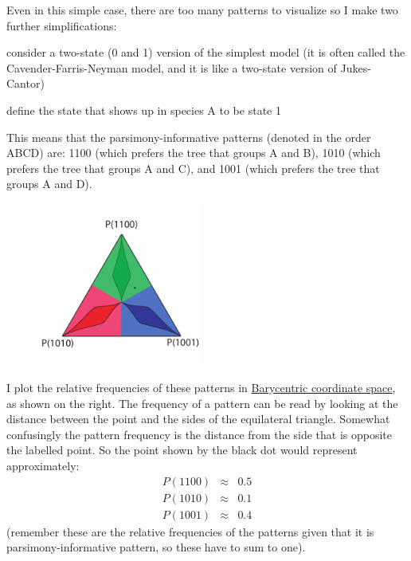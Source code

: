\documentclass[11pt]{article}
\begin{document}
Even in this simple case, there are too many patterns to visualize so I make two further simplifications:
\begin{compactitem}
	\item consider a two-state (0 and 1) version of the simplest model (it is often called the Cavender-Farris-Neyman model, and it is like a two-state version of Jukes-Cantor)
	\item define the state that shows up in species A to be state 1
\end{compactitem}
This means that the parsimony-informative patterns (denoted in the order ABCD) are: 1100 (which prefers the tree that groups A and B), 1010 (which prefers the tree that groups A and C), and 1001 (which prefers the tree that groups A and D).

\begin{figure}
  \begin{center}
   \vspace{-40pt}
    \includegraphics[width=0.48\textwidth]{../newimages/simple-treespace-sample.pdf}
   \vspace{-0pt}
   \vspace{-40pt}
  \end{center}
\end{figure}
I plot the relative frequencies of these patterns in \href{http://en.wikipedia.org/wiki/Barycentric_coordinate_system_(mathematics)}{Barycentric coordinate space}, as shown on the right.
The frequency of a pattern can be read by looking at the distance between the point and the sides of the equilateral triangle.
Somewhat confusingly the pattern frequency is the distance from the side that is opposite the labelled point.
So the point shown by the black dot would represent approximately:
\begin{eqnarray*}
	P(1100) & \approx & 0.5\\
	P(1010) & \approx & 0.1\\
	P(1001) & \approx & 0.4
\end{eqnarray*}
(remember these are the relative frequencies of the patterns given that it is parsimony-informative pattern, so these have to sum to one).
\end{document}
